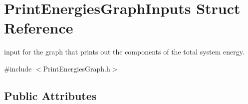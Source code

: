 \hypertarget{structPrintEnergiesGraphInputs}{}\section{Print\+Energies\+Graph\+Inputs Struct Reference}
\label{structPrintEnergiesGraphInputs}


input for the graph that prints out the components of the total system energy.  




{\ttfamily \#include $<$Print\+Energies\+Graph.\+h$>$}

\subsection*{Public Attributes}
